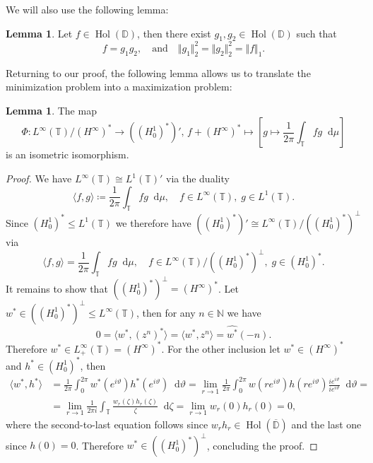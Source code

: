 \documentclass[letterpaper, 11pt]{article}
\newcommand{\D}{\mathbb{D}}
\newcommand{\T}{\mathbb{T}}
\newcommand{\N}{\mathbb{N}}
\newcommand{\1}{\mathds{1}}
\newcommand{\dd}{\mathop{}\!\mathrm{d}}
\newcommand{\cl}[1]{\overline{#1}}
\DeclareMathOperator*{\Hol}{Hol}
\theoremstyle{definition}
\newtheorem{lemma}[theorem]{Lemma}
\begin{document}
We will also use the following lemma:

\begin{lemma} \label{lem:factorisation}
  Let $f \in \Hol(\D)$, then there exist $g_1, g_2 \in \Hol(\D)$ such that
  $$ f = g_1 g_2, \quad \textrm{and} \quad \Vert g_1 \Vert_2^2 = \Vert g_2 \Vert_2^2 = \Vert f \Vert_1. $$
\end{lemma}

Returning to our proof, the following lemma allows us to translate the minimization problem into a maximization problem:

\begin{lemma}
  The map
  \begin{equation*}
    \Phi : L^\infty(\T) / (H^\infty)^* \to ((H_0^1)^*)',\, f + (H^\infty)^* \mapsto \left[ g \mapsto \frac{1}{2 \pi} \int_\T f g \dd \mu \right]
  \end{equation*}
  is an isometric isomorphism.
\end{lemma}

\begin{proof}
  We have $L^\infty(\T) \cong L^1(\T)'$ via the duality
  $$ \langle f, g \rangle \coloneqq \frac{1}{2\pi} \int_\T f g \dd \mu, \quad f \in L^\infty(\T),\; g \in L^1(\T). $$
  Since $(H_0^1)^* \leq L^1(\T)$ we therefore have $((H_0^1)^*)' \cong L^\infty(\T) / ((H_0^1)^*)^\perp$ via
  $$ \langle f, g \rangle = \frac{1}{2\pi} \int_\T f g \dd \mu, \quad f \in L^\infty(\T) / ((H_0^1)^*)^\perp,\; g \in (H_0^1)^*. $$
  It remains to show that $((H_0^1)^*)^\perp = (H^\infty)^*$. Let $w^* \in ((H_0^1)^*)^\perp \leq L^\infty(\T)$, then for any $n \in \N$ we have
  $$ 0 = \langle w^*, (z^n)^* \rangle = \langle w^*, z^n \rangle = \widehat{w^*}(-n). $$
  Therefore $w^* \in L_+^\infty(\T) = (H^\infty)^*$. For the other inclusion let $w^* \in (H^\infty)^*$ and $h^* \in (H_0^1)^*$, then
  \begin{align*}
    \langle w^*, h^* \rangle &= \frac{1}{2\pi} \int_0^{2 \pi} w^*(e^{i \vartheta}) h^*(e^{i \vartheta}) \dd \vartheta = \lim_{r \to 1} \frac{1}{2\pi} \int_0^{2 \pi} w(r e^{i \vartheta}) h(r e^{i \vartheta}) \frac{ie^{i \vartheta}}{ie^{i \vartheta}} \dd \vartheta = \\
    &= \lim_{r \to 1} \frac{1}{2\pi i} \int_\T \frac{w_r(\zeta) h_r(\zeta)}{\zeta} \dd \zeta = \lim_{r \to 1} w_r(0) h_r(0) = 0,
  \end{align*}
  where the second-to-last equation follows since $w_r h_r \in \Hol(\cl{\D})$ and the last one since $h(0) = 0$. Therefore $w^* \in ((H_0^1)^*)^\perp$, concluding the proof.
\end{proof}
\end{document}
